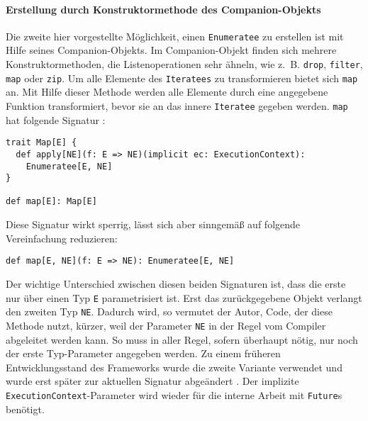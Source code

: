 \paragraph{Erstellung durch Konstruktormethode des Companion-Objekts} %
\label{par:enumerateeerstellung_durch_konstruktormethode_des_companion_objekts}\mbox{} %

Die zweite hier vorgestellte Möglichkeit, einen \lstinline|Enumeratee| zu erstellen ist mit Hilfe seines Companion-Objekts.
Im Companion-Objekt finden sich mehrere Konstruktormethoden, die Listenoperationen sehr ähneln, wie z.~B. \lstinline|drop|, \lstinline|filter|, \lstinline|map| oder \lstinline|zip|.
Um alle Elemente des \lstinline|Iteratees| zu transformieren bietet sich \lstinline|map| an.
Mit Hilfe dieser Methode werden alle Elemente durch eine angegebene Funktion transformiert, bevor sie an das innere \lstinline|Iteratee| gegeben werden.
\lstinline|map| hat folgende Signatur \cite[vgl.][Z.~361]{play_enumeratee_source_code}:
\begin{lstlisting}[caption=Die Signatur von Enumeratee.map, label=lst:die_signatur_von_enumeratee_map]
trait Map[E] {
  def apply[NE](f: E => NE)(implicit ec: ExecutionContext):
    Enumeratee[E, NE]
}

def map[E]: Map[E]
\end{lstlisting}
Diese Signatur wirkt sperrig, lässt sich aber sinngemäß auf folgende Vereinfachung reduzieren:
\begin{lstlisting}[caption=Die vereinfachte Signatur von Enumeratee.map, label=lst:die_vereinfachte_signatur_von_enumeratee_map]
def map[E, NE](f: E => NE): Enumeratee[E, NE]
\end{lstlisting}

Der wichtige Unterschied zwischen diesen beiden Signaturen ist, dass die erste nur über einen Typ \lstinline|E| parametrisiert ist.
Erst das zurückgegebene Objekt verlangt den zweiten Typ \lstinline|NE|.
Dadurch wird, so vermutet der Autor, Code, der diese Methode nutzt, kürzer, weil der Parameter \lstinline|NE| in der Regel vom Compiler abgeleitet werden kann.
So muss in aller Regel, sofern überhaupt nötig, nur noch der erste Typ-Parameter angegeben werden.
Zu einem früheren Entwicklungsstand des Frameworks wurde die zweite Variante verwendet und wurde erst später zur aktuellen Signatur abgeändert \cite[vgl.][]{play_enumeratee_map_signatur}.
Der implizite \lstinline|ExecutionContext|-Parameter wird wieder für die interne Arbeit mit \lstinline|Future|s benötigt.

